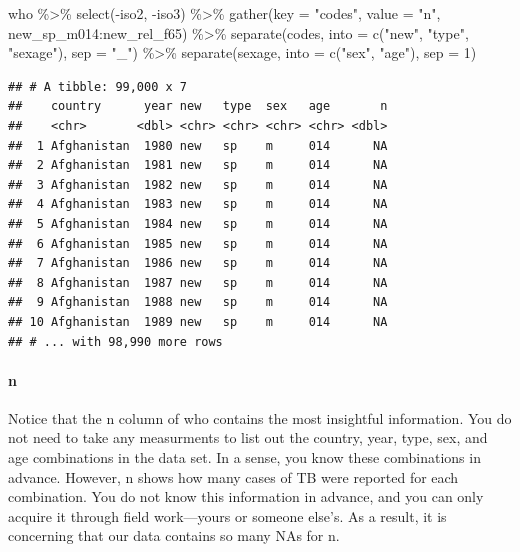 \documentclass[
]{article}
\newenvironment{Shaded}{\begin{snugshade}}{\end{snugshade}}
\newcommand{\AttributeTok}[1]{\textcolor[rgb]{0.77,0.63,0.00}{#1}}
\newcommand{\DecValTok}[1]{\textcolor[rgb]{0.00,0.00,0.81}{#1}}
\newcommand{\FunctionTok}[1]{\textcolor[rgb]{0.00,0.00,0.00}{#1}}
\newcommand{\NormalTok}[1]{#1}
\newcommand{\SpecialCharTok}[1]{\textcolor[rgb]{0.00,0.00,0.00}{#1}}
\newcommand{\StringTok}[1]{\textcolor[rgb]{0.31,0.60,0.02}{#1}}
\begin{document}
\begin{Shaded}
\begin{Highlighting}[]
\NormalTok{who }\SpecialCharTok{\%\textgreater{}\%}
  \FunctionTok{select}\NormalTok{(}\SpecialCharTok{{-}}\NormalTok{iso2, }\SpecialCharTok{{-}}\NormalTok{iso3) }\SpecialCharTok{\%\textgreater{}\%} 
  \FunctionTok{gather}\NormalTok{(}\AttributeTok{key =} \StringTok{"codes"}\NormalTok{, }\AttributeTok{value =} \StringTok{"n"}\NormalTok{, new\_sp\_m014}\SpecialCharTok{:}\NormalTok{new\_rel\_f65) }\SpecialCharTok{\%\textgreater{}\%} 
  \FunctionTok{separate}\NormalTok{(codes, }\AttributeTok{into =} \FunctionTok{c}\NormalTok{(}\StringTok{"new"}\NormalTok{, }\StringTok{"type"}\NormalTok{, }\StringTok{"sexage"}\NormalTok{), }\AttributeTok{sep =} \StringTok{"\_"}\NormalTok{) }\SpecialCharTok{\%\textgreater{}\%} 
  \FunctionTok{separate}\NormalTok{(sexage, }\AttributeTok{into =} \FunctionTok{c}\NormalTok{(}\StringTok{"sex"}\NormalTok{, }\StringTok{"age"}\NormalTok{), }\AttributeTok{sep =} \DecValTok{1}\NormalTok{)}
\end{Highlighting}
\end{Shaded}

\begin{verbatim}
## # A tibble: 99,000 x 7
##    country      year new   type  sex   age       n
##    <chr>       <dbl> <chr> <chr> <chr> <chr> <dbl>
##  1 Afghanistan  1980 new   sp    m     014      NA
##  2 Afghanistan  1981 new   sp    m     014      NA
##  3 Afghanistan  1982 new   sp    m     014      NA
##  4 Afghanistan  1983 new   sp    m     014      NA
##  5 Afghanistan  1984 new   sp    m     014      NA
##  6 Afghanistan  1985 new   sp    m     014      NA
##  7 Afghanistan  1986 new   sp    m     014      NA
##  8 Afghanistan  1987 new   sp    m     014      NA
##  9 Afghanistan  1988 new   sp    m     014      NA
## 10 Afghanistan  1989 new   sp    m     014      NA
## # ... with 98,990 more rows
\end{verbatim}

\hypertarget{n}{%
\paragraph{n}\label{n}}

Notice that the n column of who contains the most insightful
information. You do not need to take any measurments to list out the
country, year, type, sex, and age combinations in the data set. In a
sense, you know these combinations in advance. However, n shows how many
cases of TB were reported for each combination. You do not know this
information in advance, and you can only acquire it through field
work---yours or someone else's. As a result, it is concerning that our
data contains so many NAs for n.
\end{document}

